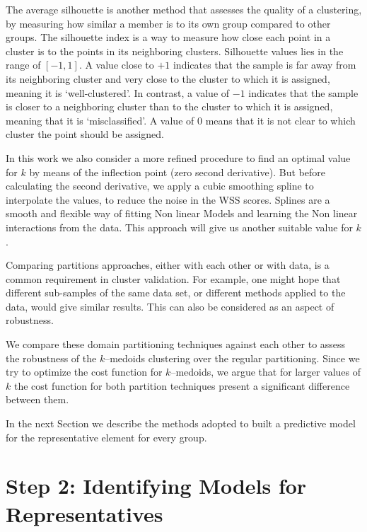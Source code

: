 The average silhouette is another method that assesses the quality of a clustering, by measuring how similar a member is to its own group compared to other groups. The silhouette index is a way to measure how close each point in a cluster is to the points in its neighboring clusters. 
Silhouette values lies in the range of $[-1, 1]$. A value close to $+1$ indicates that the sample is far away from its neighboring cluster and very close to the cluster to which it is assigned, meaning it is `well-clustered'. In contrast, a value of $-1$ indicates that the sample is closer to a neighboring cluster than to the cluster to which it is assigned, meaning that it is `misclassified'. A value of $0$ means that it is not clear to which cluster the point should be assigned. %

In this work we also consider a more refined procedure to find an optimal value for $k$ by means of the inflection point (zero second derivative). But before calculating the second derivative, we apply a cubic smoothing spline to interpolate the values, to reduce the noise in the WSS scores. Splines are a smooth and flexible way of fitting Non linear Models and learning the Non linear interactions from the data. This approach will give us another suitable value for $k$.

Comparing partitions approaches, either with each other or with data, is a common requirement in cluster validation. For example, one might hope that different sub-samples of the same data set, or different methods applied to the data, would give similar results. This can also be considered as an aspect of robustness.

We compare these domain partitioning techniques against each other to assess the robustness of the $k$--medoids clustering over the regular partitioning. Since we try to optimize the cost function for $k$--medoids, we argue that for larger values of $k$ the cost function for both partition techniques present a significant difference between them. %

In the next Section we describe the methods adopted to built a predictive model for the representative element for every group.

\section{Step 2: Identifying Models for Representatives}
\label{Sec:ModelRepresentatives}

